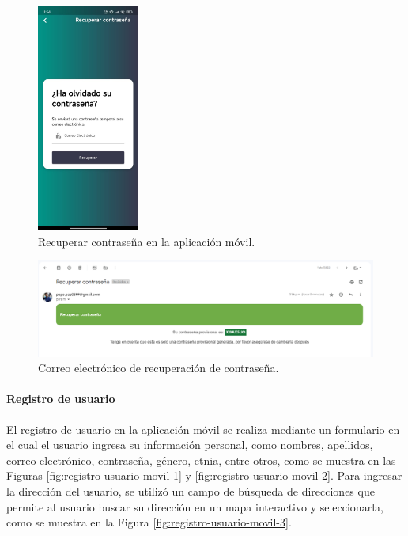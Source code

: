 \begin{figure}[H]
    \centering
    \includegraphics[width=0.3\textwidth]{chapters/III-resultados-y-discusion/resources/images/recuperar-contrasena-movil.png}
    \caption{Recuperar contraseña en la aplicación móvil.}
    \label{fig:recuperar-contrasena-movil}
\end{figure}

\begin{figure}[H]
    \centering
    \includegraphics[width=1\textwidth]{chapters/III-resultados-y-discusion/resources/images/recuperar-contrasena-email.png}
    \caption{Correo electrónico de recuperación de contraseña.}
    \label{fig:recuperar-contrasena-email}
\end{figure}

\paragraph{Registro de usuario}
El registro de usuario en la aplicación móvil se realiza mediante un formulario en el cual el usuario ingresa su información personal,
como nombres, apellidos, correo electrónico, contraseña, género, etnia, entre otros, como se muestra en las Figuras \ref{fig:registro-usuario-movil-1}
y \ref{fig:registro-usuario-movil-2}. Para ingresar la dirección del usuario, se utilizó un campo de búsqueda de direcciones que permite
al usuario buscar su dirección en un mapa interactivo y seleccionarla, como se muestra en la Figura \ref{fig:registro-usuario-movil-3}.

